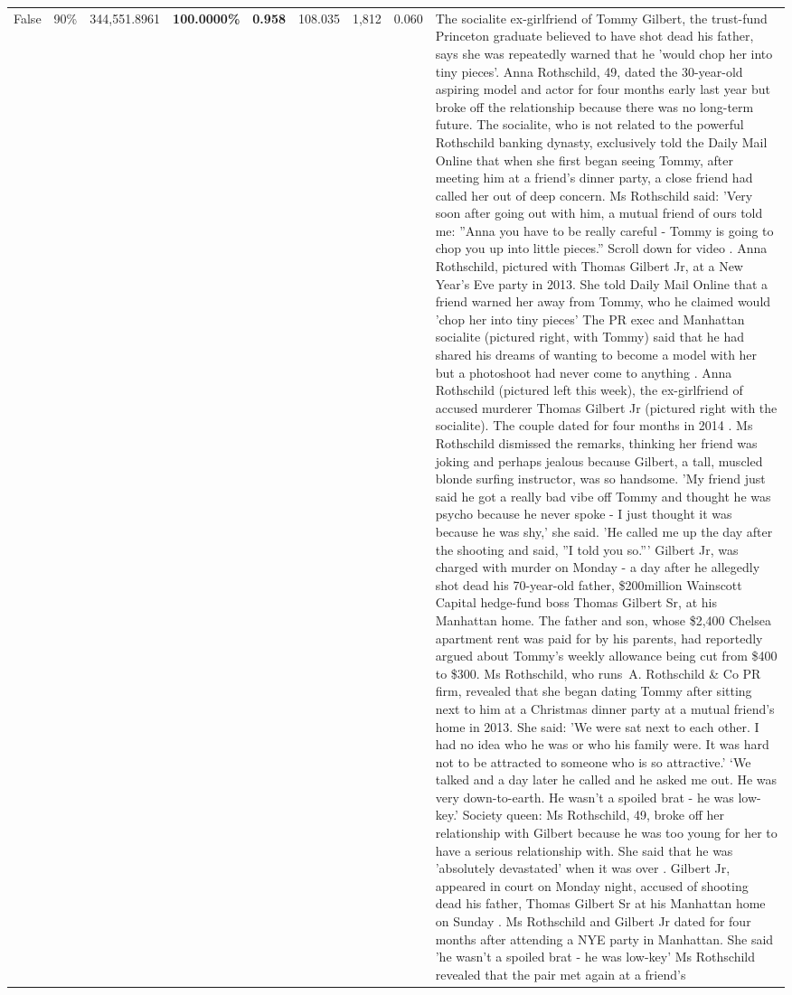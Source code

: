 \begin{table}[H]
\begin{tabular}{lllrlllll}
False & 90\% & 344,551.8961 & \bfseries \color{red} 100.0000\% & \bfseries \color{red} 0.958 & 108.035 & 1,812 & 0.060 & The socialite ex-girlfriend of Tommy Gilbert, the trust-fund Princeton graduate believed to have shot dead his father, says she was repeatedly warned that he 'would chop her into tiny pieces'. Anna Rothschild, 49, dated the 30-year-old aspiring model and actor for four months early last year but broke off the relationship because there was no long-term future. The socialite, who is not related to the powerful Rothschild banking dynasty, exclusively told the Daily Mail Online that when she first began seeing Tommy, after meeting him at a friend's dinner party, a close friend had called her out of deep concern. Ms Rothschild said: 'Very soon after going out with him, a mutual friend of ours told me: ''Anna you have to be really careful - Tommy is going to chop you up into little pieces.'' Scroll down for video . Anna Rothschild, pictured with Thomas Gilbert Jr, at a New Year's Eve party in 2013. She told Daily Mail Online that a friend warned her away from Tommy, who he claimed would 'chop her into tiny pieces' The PR exec and Manhattan socialite (pictured right, with Tommy) said that he had shared his dreams of wanting to become a model with her but a photoshoot had never come to anything . Anna Rothschild (pictured left this week), the ex-girlfriend of accused murderer Thomas Gilbert Jr (pictured right with the socialite). The couple dated for four months in 2014 . Ms Rothschild dismissed the remarks, thinking her friend was joking and perhaps jealous because Gilbert, a tall, muscled blonde surfing instructor, was so handsome. 'My friend just said he got a really bad vibe off Tommy and thought he was psycho because he never spoke - I just thought it was because he was shy,' she said. 'He called me up the day after the shooting and said, ''I told you so.''' Gilbert Jr, was charged with murder on Monday - a day after he allegedly shot dead his 70-year-old father, \$200million Wainscott Capital hedge-fund boss Thomas Gilbert Sr, at his Manhattan home. The father and son, whose \$2,400 Chelsea apartment rent was paid for by his parents, had reportedly argued about Tommy's weekly allowance being cut from \$400 to \$300. Ms Rothschild, who runs A. Rothschild \& Co PR firm, revealed that she began dating Tommy after sitting next to him at a Christmas dinner party at a mutual friend's home in 2013. She said: 'We were sat next to each other. I had no idea who he was or who his family were. It was hard not to be attracted to someone who is so attractive.' ‘We talked and a day later he called and he asked me out. He was very down-to-earth. He wasn’t a spoiled brat - he was low-key.’ Society queen: Ms Rothschild, 49, broke off her relationship with Gilbert because he was too young for her to have a serious relationship with. She said that he was 'absolutely devastated' when it was over . Gilbert Jr, appeared in court on Monday night, accused of shooting dead his father, Thomas Gilbert Sr at his Manhattan home on Sunday . Ms Rothschild and Gilbert Jr dated for four months after attending a NYE party in Manhattan. She said 'he wasn't a spoiled brat - he was low-key' Ms Rothschild revealed that the pair met again at a friend’s 
\end{tabular}
\end{table}
